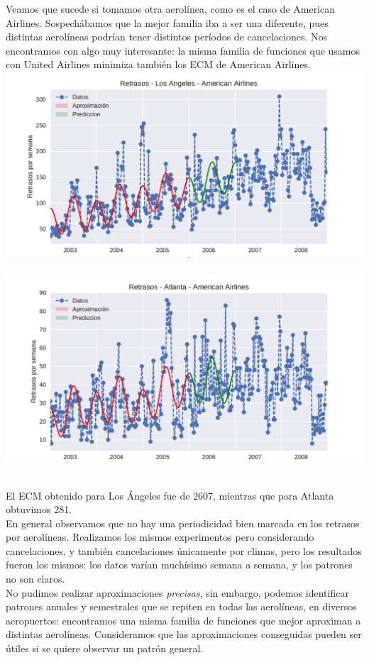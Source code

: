 Veamos que sucede si tomamos otra aerolínea, como es el caso de American Airlines. Sospechábamos que la mejor familia iba a ser una diferente, pues distintas aerolíneas podrían tener distintos períodos de cancelaciones. Nos encontramos con algo muy interesante: la misma familia de funciones que usamos con United Airlines minimiza también los ECM de American Airlines. \\

{\centering
  \includegraphics[width=0.95\linewidth]{informe/imagenes/retrasosAmericanAirlinesLAvol3.pdf}
}
$ $\newline
{\centering
  \includegraphics[width=0.95\linewidth]{informe/imagenes/retrasosAmericanAirlinesATLvol3.pdf}
}
$ $\newline

El ECM obtenido para Los Ángeles fue de 2607, mientras que para Atlanta obtuvimos 281. \\

En general observamos que no hay una periodicidad bien marcada en los retrasos por aerolíneas. Realizamos los mismos experimentos pero considerando cancelaciones, y también cancelaciones únicamente por climas, pero los resultados fueron los mismos: los datos varían muchísimo semana a semana, y los patrones no son claros. \\

No pudimos realizar aproximaciones \textit{precisas}, sin embargo, podemos identificar patrones anuales y semestrales que se repiten en todas las aerolíneas, en diversos aeropuertos: encontramos una misma familia de funciones que mejor aproximan a distintas aerolíneas. Consideramos que las aproximaciones conseguidas pueden ser útiles si se quiere observar un patrón general. \\

